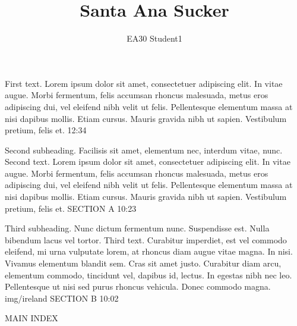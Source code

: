 \documentclass[10pt,final,hyphenatedtitles]{papertex}
\author{EA30 Student1}
\title{Santa Ana Sucker}
\begin{document}



\begin{frontpage}

						{First text. Lorem ipsum dolor sit amet, consectetuer adipiscing elit. In vitae augue. Morbi fermentum, felis accumsan rhoncus malesuada, metus eros adipiscing dui, vel eleifend nibh velit ut felis. Pellentesque elementum massa at nisi dapibus mollis. Etiam cursus. Mauris gravida nibh ut sapien. Vestibulum pretium, felis et.}%
						{12:34}

%
						{Second subheading. Facilisis sit amet, elementum nec, interdum vitae, nunc.}%
						{Second text. Lorem ipsum dolor sit amet, consectetuer adipiscing elit. In vitae augue. Morbi fermentum, felis accumsan rhoncus malesuada, metus eros adipiscing dui, vel eleifend nibh velit ut felis. Pellentesque elementum massa at nisi dapibus mollis. Etiam cursus. Mauris gravida nibh ut sapien. Vestibulum pretium, felis et.}%
						{SECTION A}%
						{10:23}

%
					{Third subheading. Nunc dictum fermentum nunc. Suspendisse est. Nulla bibendum lacus vel tortor.}%
					{Third text. Curabitur imperdiet, est vel commodo eleifend, mi urna vulputate lorem, at rhoncus diam augue vitae magna. In nisi. Vivamus elementum blandit sem. Cras sit amet justo. Curabitur diam arcu, elementum commodo, tincidunt vel, dapibus id, lectus. In egestas nibh nec leo. Pellentesque ut nisi sed purus rhoncus vehicula. Donec commodo magna.}%
					{img/ireland}%
					{SECTION B}%
					{10:02}

\begin{indexblock}{MAIN INDEX}




\end{indexblock}
\end{frontpage}
\end{document}

